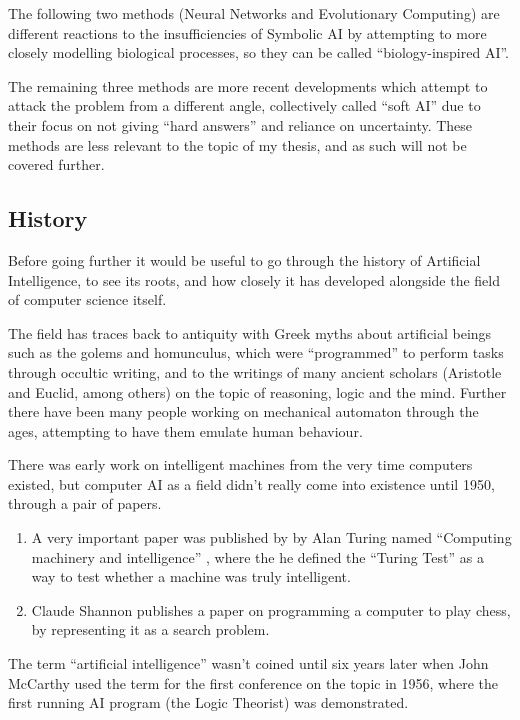 \documentclass[]{report}
\begin{document}
The following two methods (Neural Networks and Evolutionary Computing) are
different reactions to the insufficiencies of Symbolic AI by attempting to more
closely modelling biological processes, so they can be called ``biology-inspired
AI''.

The remaining three methods are more recent developments which attempt to attack
the problem from a different angle, collectively called ``soft AI'' due to their
focus on not giving ``hard answers'' and reliance on uncertainty. These methods
are less relevant to the topic of my thesis, and as such will not be covered
further.

\subsection{History}
\label{sec:trad-ai-history}

Before going further it would be useful to go through the history of Artificial
Intelligence, to see its roots, and how closely it has developed alongside the
field of computer science itself. \citep{luger2005artificial,buchanan2002brief}

The field has traces back to antiquity with Greek myths about artificial beings
such as the golems and homunculus, which were ``programmed'' to perform tasks
through occultic writing, and to the writings of many ancient scholars
(Aristotle and Euclid, among others) on the topic of reasoning, logic and the
mind. Further there have been many people working on mechanical automaton
through the ages, attempting to have them emulate human behaviour.

There was early work on intelligent machines from the very time computers
existed, but computer AI as a field didn't really come into existence until
1950, through a pair of papers.

\begin{enumerate}
\item A very important paper was published by by Alan Turing named ``Computing
  machinery and intelligence'' \citep{turing1950computing}, where the he defined
  the ``Turing Test'' as a way to test whether a machine was truly intelligent.
\item Claude Shannon publishes a paper on programming a computer to play chess,
  by representing it as a search problem. \citep{shannon1950programming}
\end{enumerate}

The term ``artificial intelligence'' wasn't coined until six years later when
John McCarthy used the term for the first conference on the topic in 1956, where
the first running AI program (the Logic Theorist) was demonstrated.
\end{document}
